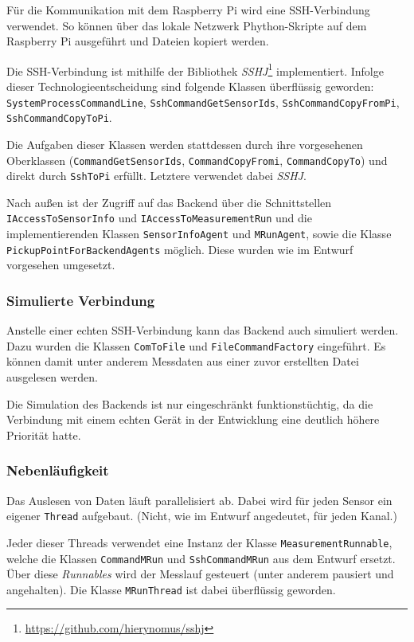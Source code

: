 \documentclass[parskip=full]{scrartcl}
\begin{document}
Für die Kommunikation mit dem Raspberry Pi wird eine SSH-Verbindung verwendet. So können über das lokale Netzwerk Phython-Skripte auf dem Raspberry Pi ausgeführt und Dateien kopiert werden.

Die SSH-Verbindung ist mithilfe der Bibliothek \textit{SSHJ}\footnote{\url{https://github.com/hierynomus/sshj}} implementiert. Infolge dieser Technologieentscheidung sind folgende Klassen überflüssig geworden: \verb:SystemProcessCommandLine:, \verb:SshCommandGetSensorIds:, \verb:SshCommandCopyFromPi:, \verb:SshCommandCopyToPi:.

Die Aufgaben dieser Klassen werden stattdessen durch ihre vorgesehenen Oberklassen (\verb:CommandGetSensorIds:, \verb:CommandCopyFromi:, \verb:CommandCopyTo:) und direkt durch \verb:SshToPi: erfüllt. Letztere verwendet dabei \textit{SSHJ}.

Nach außen ist der Zugriff auf das Backend über die Schnittstellen \verb:IAccessToSensorInfo: und \verb:IAccessToMeasurementRun: und die implementierenden Klassen \verb:SensorInfoAgent: und \verb:MRunAgent:, sowie die Klasse \verb:PickupPointForBackendAgents: möglich. Diese wurden wie im Entwurf vorgesehen umgesetzt.

\subsubsection{Simulierte Verbindung}

Anstelle einer echten SSH-Verbindung kann das Backend auch simuliert werden. Dazu wurden die Klassen \verb:ComToFile: und \verb:FileCommandFactory: eingeführt. Es können damit unter anderem Messdaten aus einer zuvor erstellten Datei ausgelesen werden.

Die Simulation des Backends ist nur eingeschränkt funktionstüchtig, da die Verbindung mit einem echten Gerät in der Entwicklung eine deutlich höhere Priorität hatte.

\subsubsection{Nebenläufigkeit}

Das Auslesen von Daten läuft parallelisiert ab. Dabei wird für jeden Sensor ein eigener \verb:Thread: aufgebaut. (Nicht, wie im Entwurf angedeutet, für jeden Kanal.)

Jeder dieser Threads verwendet eine Instanz der Klasse \verb:MeasurementRunnable:, welche die Klassen \verb:CommandMRun: und \verb:SshCommandMRun: aus dem Entwurf ersetzt. Über diese \textit{Runnables} wird der Messlauf gesteuert (unter anderem pausiert und angehalten). Die Klasse \verb:MRunThread: ist dabei überflüssig geworden.
\end{document}
